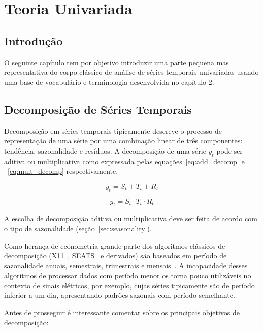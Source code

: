 \chapter{Teoria Univariada}
\label{chap:univariate_theory}

\section*{Introdução}

O seguinte capítulo tem por objetivo introduzir uma parte pequena mas
representativa do corpo clássico de análise de séries temporais univariadas
usando uma base de vocabulário e terminologia desenvolvida no capítulo 2.

\newpage

\section{Decomposição de Séries Temporais}
\label{sec:decomposition}

Decomposição em séries temporais tipicamente descreve o processo de
representação de uma série por uma combinação linear de três componentes:
tendência, sazonalidade e resíduos. A decomposição de uma série $y_t$ pode ser
aditiva ou multiplicativa como expressada pelas equações~\ref{eq:add_decomp} e
~\ref{eq:mult_decomp} respectivamente.

\begin{equation}\label{eq:add_decomp}
    y_t = S_t + T_t + R_t
\end{equation}

\begin{equation}\label{eq:mult_decomp}
    y_t = S_t \cdot T_t \cdot R_t
\end{equation}

A escolha de decomposição aditiva ou multiplicativa deve ser feita de acordo
com o tipo de sazonalidade (seção~\ref{sec:seasonality}).

Como herança de econometria grande parte dos algoritmos clássicos de
decomposição (X11~\cite{x11}, SEATS~\cite[capítulo~5.2]{SEATS} e derivados) são
baseados em período de sazonalidade anuais, semestrais, trimestrais e
mensais~\cite{athana}. A incapacidade desses algoritmos de processar dados com
período menor os torna pouco utilizáveis no contexto de sinais elétricos, por
exemplo, cujas séries tipicamente são de período inferior a um dia,
apresentando padrões sazonais com período semelhante.

Antes de prosseguir é interessante comentar sobre os principais objetivos de
decomposição:

